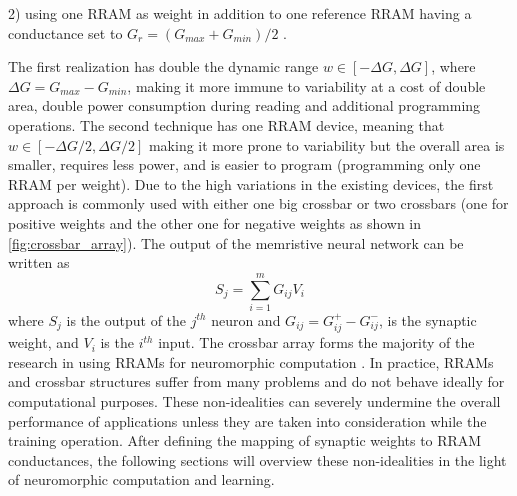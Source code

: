\documentclass[english]{article}
\renewcommand{\cite}{\citep}
\begin{document}
2) using one RRAM as weight in addition to one reference RRAM having a conductance set to $G_r=(G_{max}+G_{min})/2$ \cite{chang2017mitigating,fouda2018overcoming}. 

The first realization has double the dynamic range $w\in [-\Delta G, \Delta G]$, where $\Delta G=G_{max}-G_{min}$, making it more immune to variability at a cost of double area, double power consumption during reading and additional programming operations. 
The second technique has one RRAM device, meaning that $w\in [-\Delta G/2, \Delta G/2]$ making it more prone to variability but the overall area is smaller, requires less power, and is easier to program (programming only one RRAM per weight).  
Due to the high variations in the existing devices, the first approach is commonly used with either one big crossbar or two crossbars (one for positive weights and the other one for negative weights as shown in \ref{fig:crossbar_array}). 
The output of the memristive neural network can be written as
%
\begin{equation}
    S_j=\sum_{i=1}^m G_{ij} V_i
\end{equation}
\noindent where $S_j$ is the output of the $j^{th}$ neuron and $G_{ij}=G_{ij}^{+} - G_{ij}^{-}$, is the synaptic weight, and $V_i$ is the $i^{th}$ input. 
%
The crossbar array forms the majority of the research in using RRAMs for neuromorphic computation \cite{yu2018neuro}.
In practice, RRAMs and crossbar structures suffer from many problems and do not behave ideally for computational purposes.
These non-idealities can severely undermine the overall performance of applications unless they are taken into consideration while the training operation. 
After defining the mapping of synaptic weights to RRAM conductances, the following sections will overview these non-idealities in the light of neuromorphic computation and learning.
\end{document}
